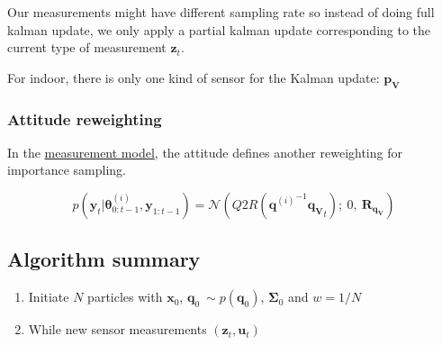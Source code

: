 \documentclass[12pt,]{article}
\providecommand{\tightlist}{%
  \setlength{\itemsep}{0pt}\setlength{\parskip}{0pt}}
\begin{document}
Our measurements might have different sampling rate so instead of doing
full kalman update, we only apply a partial kalman update corresponding
to the current type of measurement \(\mathbf{z}_t\).

For indoor, there is only one kind of sensor for the Kalman update:
\(\mathbf{p_V}\)

\subsubsection{Attitude reweighting}\label{attitude-reweighting}

In the \protect\hyperlink{measurements-model}{measurement model}, the
attitude defines another reweighting for importance sampling.

\[p(\mathbf{y}_t | \boldsymbol{\theta}^{(i)}_{0:t-1}, \mathbf{y}_{1:t-1}) = \mathcal{N}(Q2R({\mathbf{q}^{(i)}}^{-1}\mathbf{q_V}_t);~ 0 ,~ \mathbf{R}_{\mathbf{q_V}})\]

\subsection{Algorithm summary}\label{algorithm-summary}

\begin{enumerate}
\def\labelenumi{\arabic{enumi}.}
\tightlist
\item
  Initiate \(N\) particles with \(\mathbf{x}_0\),
  \(\mathbf{q}_0 ~ \sim p(\mathbf{q}_0)\), \(\mathbf{\Sigma}_0\) and
  \(w = 1/N\)
\item
  While new sensor measurements \((\mathbf{z}_t, \mathbf{u}_t)\)
\end{enumerate}
\end{document}
